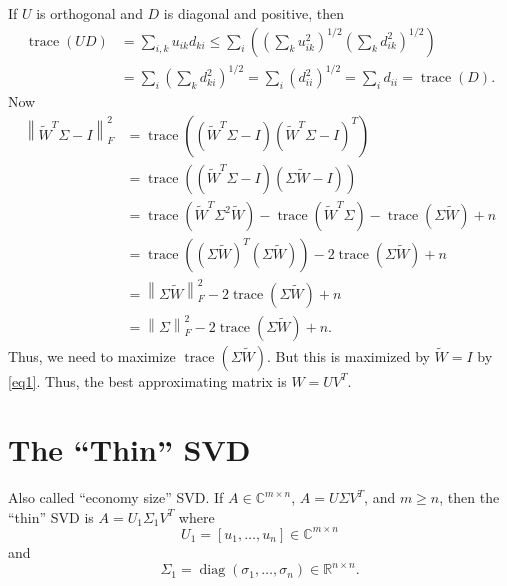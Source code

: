 \documentclass{article}
\newcommand{\norm}[1]{\left \lVert #1 \right \rVert}
\begin{document}
If $U$ is orthogonal and $D$ is diagonal and positive, then
\begin{equation}\label{eq1}
\begin{aligned}
\operatorname{trace} (UD) &= \sum_{i,k} u_{ik} d_{ki} \leq \sum _{i}
\left ( \left ( \sum_{k} u_{ik}^{2} \right )^{1/2} \left ( \sum_{k}
d_{ik}^{2} \right )^{1/2} \right ) \\
&= \sum_{i} \left ( \sum_{k} d_{ki}^{2} \right )^{1/2} = \sum_{i}
\left ( d_{ii}^{2} \right )^{1/2} = \sum_{i} d_{ii} =
\operatorname{trace}(D).
\end{aligned}
\end{equation}
Now
\begin{align*}
\norm{\tilde{W}^{T} \Sigma - I}_{F}^{2} &= \operatorname{trace}
\left ( \left( \tilde{W}^{T} \Sigma - I \right ) \left(
\tilde{W}^{T} \Sigma - I \right )^{T} \right ) \\
&= \operatorname{trace} \left ( \left( \tilde{W}^{T} \Sigma   - I
\right
) \left( \Sigma \tilde{W}  - I \right ) \right ) \\
&= \operatorname{trace} \left ( \tilde{W}^{T} \Sigma^{2} \tilde{W}
\right ) - \operatorname{trace} \left ( \tilde{W}^{T} \Sigma \right
) - \operatorname{trace} \left ( \Sigma \tilde{W} \right ) + n \\
&= \operatorname{trace} \left ( \left ( \Sigma \tilde{W} \right
)^{T} \left ( \Sigma \tilde{W}  \right ) \right ) - 2
\operatorname{trace} \left (\Sigma \tilde{W} \right ) + n \\
&= \norm{\Sigma \tilde{W}}_{F}^{2} - 2 \operatorname{trace} \left
(\Sigma \tilde{W} \right ) + n \\
&= \norm{\Sigma }_{F}^{2} - 2 \operatorname{trace} \left (\Sigma
\tilde{W} \right ) + n.
\end{align*}
Thus, we need to maximize $\operatorname{trace} \left (\Sigma
\tilde{W} \right )$. But this is maximized by $ \tilde{W} = I$ by
\eqref{eq1}. Thus, the best approximating matrix is $W=UV^{T}$.


\section{The ``Thin'' SVD}
Also called ``economy size'' SVD.  If $A \in \mathbb{C}^{m \times
n}$, $A=U \Sigma V^{T}$, and $m \ge n$, then the ``thin'' SVD is
$A=U_{1} \Sigma_{1} V^{T}$ where
\begin{equation*}
U_{1} = [u_{1},\ldots,u_{n}] \in \mathbb{C}^{m \times n}
\end{equation*}
and
\begin{equation*}
\Sigma_{1} = \operatorname{diag}(\sigma_{1},\ldots,\sigma_{n}) \in
\mathbb{R}^{n \times n}.
\end{equation*}
\end{document}
